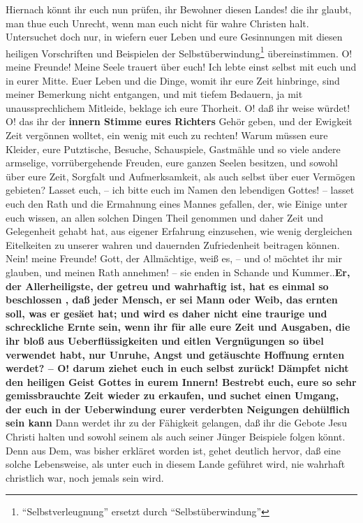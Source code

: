 Hiernach könnt ihr euch nun prüfen, ihr Bewohner diesen Landes! die ihr glaubt,
man thue euch Unrecht, wenn man euch nicht für wahre Christen halt. Untersuchet
doch nur, in wiefern euer Leben und eure Gesinnungen mit diesen heiligen
Vorschriften und Beispielen der Selbstüberwindung\footnote{"`Selbstverleugnung"' ersetzt durch "`Selbstüberwindung"'} übereinstimmen. O! meine
Freunde! Meine Seele trauert über euch! Ich lebte einst selbst mit euch und in
eurer Mitte. Euer Leben und die Dinge, womit ihr eure Zeit hinbringe, sind
meiner Bemerkung nicht entgangen, und mit tiefem Bedauern, ja mit
unaussprechlichem Mitleide, beklage ich eure Thorheit. O! daß ihr weise würdet!
O! das ihr der \textbf{innern Stimme eures Richters} Gehör geben, und der Ewigkeit Zeit
vergönnen wolltet, ein wenig mit euch zu rechten! Warum müssen eure Kleider,
eure Putztische, Besuche, Schauspiele, Gastmähle und so viele andere armselige,
vorrübergehende Freuden, eure ganzen Seelen besitzen, und sowohl über eure Zeit,
Sorgfalt und Aufmerksamkeit, als auch selbst über euer Vermögen gebieten? Lasset
euch, -- ich bitte euch im Namen den lebendigen Gottes! -- lasset euch den Rath
und die Ermahnung eines Mannes gefallen, der, wie Einige unter euch wissen, an
allen solchen Dingen Theil genommen und daher Zeit und Gelegenheit gehabt hat,
aus eigener Erfahrung einzusehen, wie wenig dergleichen Eitelkeiten zu unserer
wahren und dauernden Zufriedenheit beitragen können. Nein! meine Freunde! Gott,
der Allmächtige, weiß es, -- und o! möchtet ihr mir glauben, und meinen Rath
annehmen! -- sie enden in Schande und Kummer..\textbf{Er, der Allerheiligste, der getreu
und wahrhaftig ist, hat es einmal so beschlossen , daß jeder Mensch, er sei Mann
oder Weib, das ernten soll, was er gesäet hat; und wird es daher nicht eine
traurige und schreckliche Ernte sein, wenn ihr für alle eure Zeit und Ausgaben,
die ihr bloß aus Ueberflüssigkeiten und eitlen Vergnügungen so übel verwendet
habt, nur Unruhe, Angst und getäuschte Hoffnung ernten werdet? -- O! darum
ziehet euch in euch selbst zurück! Dämpfet nicht den heiligen Geist Gottes in
eurem Innern! Bestrebt  euch, eure so sehr gemissbrauchte Zeit wieder zu
erkaufen, und suchet einen Umgang, der euch in der Ueberwindung eurer verderbten
Neigungen dehülflich sein kann} Dann werdet ihr zu der Fähigkeit gelangen, daß
ihr die Gebote Jesu Christi halten und sowohl seinem als auch seiner Jünger
Beispiele folgen könnt. Denn aus Dem, was bisher erkläret worden ist, gehet
deutlich hervor, daß eine solche Lebensweise, als unter euch in diesem Lande
geführet wird, nie wahrhaft christlich war, noch jemals sein wird.

